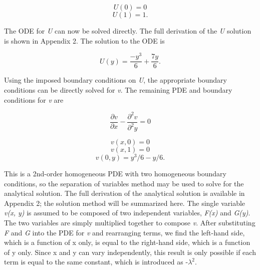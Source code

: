 \documentclass[10pt]{article}
\begin{document}
\begin{multicols}{2}
    \noindent
    \begin{equation}
    U(0) = 0
    \label{U_bc1}
    \end{equation}
    \noindent
    \begin{equation}
    U(1) = 1.
    \label{U_bc2}
    \end{equation}
\end{multicols}



The ODE for \textit{U} can now be solved directly. The full derivation of the \textit{U} solution is shown in Appendix 2. The solution to the ODE is

\vspace{-11pt}
\begin{equation}
U(y) = \frac{-y^3}{6} + \frac{7y}{6}.
\label{U_soln}
\end{equation}

Using the imposed boundary conditions on \textit{U}, the appropriate boundary conditions can be directly solved for \textit{v}. The remaining PDE and boundary conditions for \textit{v} are

\vspace{-5pt}
\begin{equation}
\frac{\partial v}{\partial x} - \frac{\partial^2 v}{\partial^2 y} = 0
\label{v_pde}
\end{equation}

\vspace{-5pt}
\begin{multicols}{3}
    \noindent
    \begin{equation}
    v(x, 0) = 0
    \label{v_bc1}
    \end{equation}
	\noindent
    \begin{equation}
    v(x, 1) = 0
    \label{v_bc2}
    \end{equation}
	\noindent
    \begin{equation}
    v(0, y) = y^3/6 - y/6.
    \label{v_bc3}
    \end{equation}
\end{multicols}


\vspace{-5pt}
This is a 2nd-order homogeneous PDE with two homogeneous boundary conditions, so the separation of variables method may be used to solve for the analytical solution. The full derivation of the analytical solution is available in Appendix 2; the solution method will be summarized here. The single variable \textit{v(x, y)} is assumed to be composed of two independent variables, \textit{F(x)} and \textit{G(y)}. The two variables are simply multiplied together to compose \textit{v}. After substituting \textit{F} and \textit{G} into the PDE for \textit{v} and rearranging terms, we find the left-hand side, which is a function of x only, is equal to the right-hand side, which is a function of y only. Since x and y can vary independently, this result is only possible if each term is equal to the same constant, which is introduced as -$\lambda ^2$.
\end{document}
